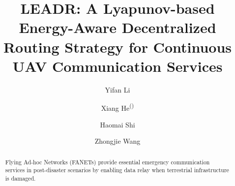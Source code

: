 \documentclass[runningheads]{llncs}
\begin{document}
%
\title{\textbf{LEADR: A Lyapunov-based Energy-Aware Decentralized Routing Strategy for Continuous UAV Communication Services}}

\author{Yifan Li \and Xiang He\textsuperscript{(\Letter)} \and Haomai Shi \and Zhongjie Wang}

\maketitle

\begin{abstract}
Flying Ad-hoc Networks (FANETs) provide essential emergency communication services in post-disaster scenarios by enabling data relay when terrestrial infrastructure is damaged.

\end{abstract}
\end{document}
